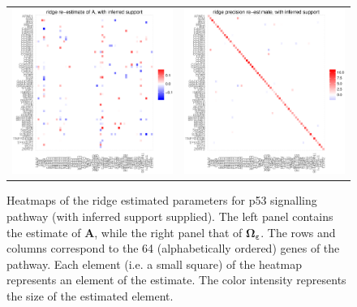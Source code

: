 \begin{figure}[h!]
\centering
\begin{tabular}{cc}
\includegraphics[scale=0.3]{Ahat_sparse.eps}
&
\includegraphics[scale=0.3]{Phat_sparse.eps}
\end{tabular}
\caption{Heatmaps of the ridge estimated parameters for p53 signalling pathway (with inferred support supplied). The left panel contains the estimate of $\mathbf{A}$, while the right panel that of $\boldsymbol{\Omega_{\varepsilon}}$. The rows and columns correspond to the 64 (alphabetically ordered) genes of the pathway. Each element (i.e. a small square) of the heatmap represents an element of the estimate. The color intensity represents the size of the estimated element.
}
\label{figSM:ridgeEstimates_sparse}
\end{figure}

